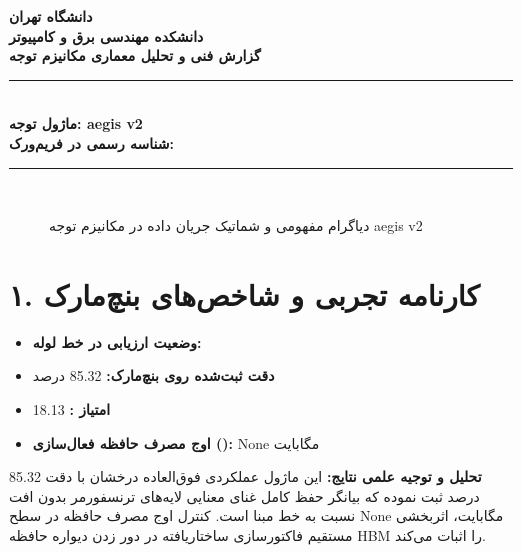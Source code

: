 \documentclass[12pt,a4paper]{article}
\begin{document}
\begin{center}
{\Large\bfseries دانشگاه تهران}\\[0.2cm]
{\large\bfseries دانشکده مهندسی برق و کامپیوتر}\\[0.2cm]
{\large\bfseries گزارش فنی و تحلیل معماری مکانیزم توجه}\\[0.5cm]
\rule{\linewidth}{1pt}\\[0.3cm]
{\LARGE\bfseries ماژول توجه: aegis v2}\\[0.2cm]
{\large \textbf{شناسه رسمی در فریم‌ورک:} }\\[0.2cm]
\rule{\linewidth}{1pt}\\[0.5cm]
\end{center}

\begin{figure}[H]
\centering
{}
\caption{دیاگرام مفهومی و شماتیک جریان داده در مکانیزم توجه aegis v2}
\end{figure}

\section*{۱. کارنامه تجربی و شاخص‌های بنچ‌مارک}
\begin{itemize}
\item \textbf{وضعیت ارزیابی در خط لوله:} 
\item \textbf{دقت ثبت‌شده روی بنچ‌مارک:} 85.32 درصد
\item \textbf{امتیاز :} 18.13
\item \textbf{اوج مصرف حافظه فعال‌سازی ():} None مگابایت
\end{itemize}
\textbf{تحلیل و توجیه علمی نتایج:} این ماژول عملکردی فوق‌العاده درخشان با دقت 85.32 درصد ثبت نموده که بیانگر حفظ کامل غنای معنایی لایه‌های ترنسفورمر بدون افت نسبت به خط مبنا است. کنترل اوج مصرف حافظه در سطح None مگابایت، اثربخشی مستقیم فاکتورسازی ساختاریافته در دور زدن دیواره حافظه HBM را اثبات می‌کند.
\end{document}
